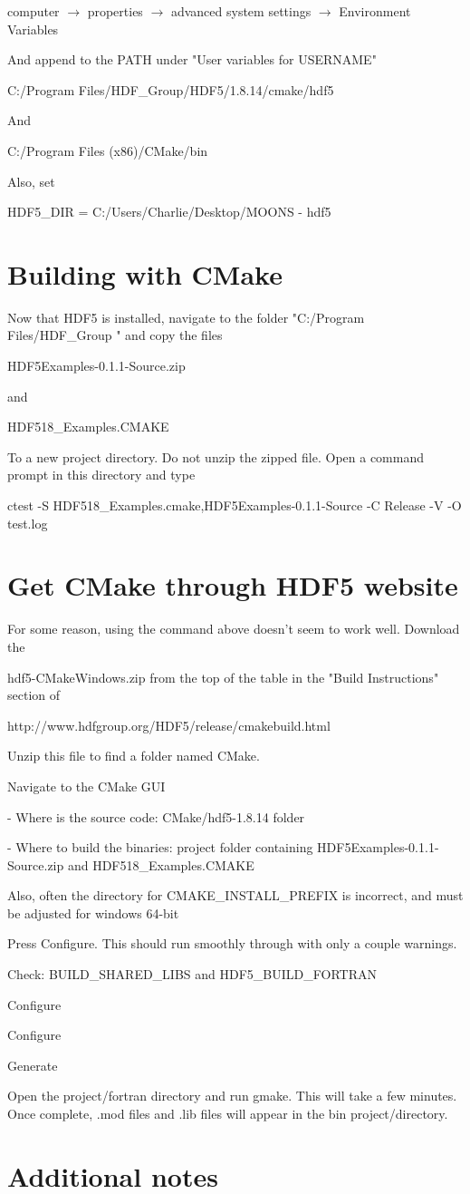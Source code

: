 \documentclass[11pt]{article}
\begin{document}
computer $\rightarrow$ properties $\rightarrow$ advanced system settings $\rightarrow$ Environment Variables

And append to the PATH under "User variables for USERNAME"

C:/Program Files/HDF\_Group/HDF5/1.8.14/cmake/hdf5

And

C:/Program Files (x86)/CMake/bin

Also, set

HDF5\_DIR = C:/Users/Charlie/Desktop/MOONS - hdf5

\section{Building with CMake}

Now that HDF5 is installed, navigate to the folder "C:/Program Files/HDF\_Group " and copy the files

HDF5Examples-0.1.1-Source.zip

and 

HDF518\_Examples.CMAKE

To a new project directory. Do not unzip the zipped file. Open a command prompt in this directory and type

ctest -S HDF518\_Examples.cmake,HDF5Examples-0.1.1-Source -C Release -V -O test.log

\section{Get CMake through HDF5 website}

For some reason, using the command above doesn't seem to work well. Download the 

hdf5-CMakeWindows.zip from the top of the table in the "Build Instructions" section of 

http://www.hdfgroup.org/HDF5/release/cmakebuild.html

Unzip this file to find a folder named CMake.

Navigate to the CMake GUI

- Where is the source code: CMake/hdf5-1.8.14 folder

- Where to build the binaries: project folder containing HDF5Examples-0.1.1-Source.zip and HDF518\_Examples.CMAKE

Also, often the directory for CMAKE\_INSTALL\_PREFIX is incorrect, and must be adjusted for windows 64-bit

Press Configure. This should run smoothly through with only a couple warnings.

Check: BUILD\_SHARED\_LIBS and HDF5\_BUILD\_FORTRAN

Configure

Configure

Generate

Open the project/fortran directory and run gmake. This will take a few minutes. Once complete, .mod files and .lib files will appear in the bin project/directory.


\section{Additional notes}
\end{document}
